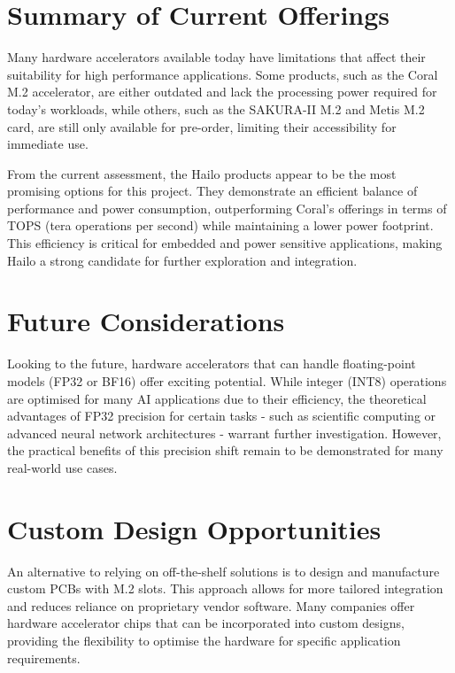 \section{Summary of Current Offerings}
Many hardware accelerators available today have limitations that affect their suitability for high performance applications. Some products, such as the Coral M.2 accelerator, are either outdated and lack the processing power required for today's workloads, while others, such as the SAKURA-II M.2 and Metis M.2 card, are still only available for pre-order, limiting their accessibility for immediate use.

From the current assessment, the Hailo products appear to be the most promising options for this project. They demonstrate an efficient balance of performance and power consumption, outperforming Coral's offerings in terms of TOPS (tera operations per second) while maintaining a lower power footprint. This efficiency is critical for embedded and power sensitive applications, making Hailo a strong candidate for further exploration and integration.

\section{Future Considerations}
Looking to the future, hardware accelerators that can handle floating-point models (FP32 or BF16) offer exciting potential. While integer (INT8) operations are optimised for many AI applications due to their efficiency, the theoretical advantages of FP32 precision for certain tasks - such as scientific computing or advanced neural network architectures - warrant further investigation. However, the practical benefits of this precision shift remain to be demonstrated for many real-world use cases.

\section{Custom Design Opportunities}
An alternative to relying on off-the-shelf solutions is to design and manufacture custom PCBs with M.2 slots. This approach allows for more tailored integration and reduces reliance on proprietary vendor software. Many companies offer hardware accelerator chips that can be incorporated into custom designs, providing the flexibility to optimise the hardware for specific application requirements.

